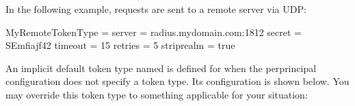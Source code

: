 \documentclass[letterpaper,10pt,english]{sphinxmanual}
\begin{document}
\sphinxAtStartPar
In the following example, requests are sent to a remote server via UDP:

\begin{sphinxVerbatim}[commandchars=\\\{\}]
[otp]
    MyRemoteTokenType = \PYGZob{}
        server = radius.mydomain.com:1812
        secret = SEmfiajf42\PYGZdl{}
        timeout = 15
        retries = 5
        strip\PYGZus{}realm = true
    \PYGZcb{}
\end{sphinxVerbatim}

\sphinxAtStartPar
An implicit default token type named  is defined for when
the per\sphinxhyphen{}principal configuration does not specify a token type.  Its
configuration is shown below.  You may override this token type to
something applicable for your situation:

\begin{sphinxVerbatim}[commandchars=\\\{\}]
\PYG{p}{[}\PYG{p}{]}
      
          
\end{sphinxVerbatim}
\end{document}
